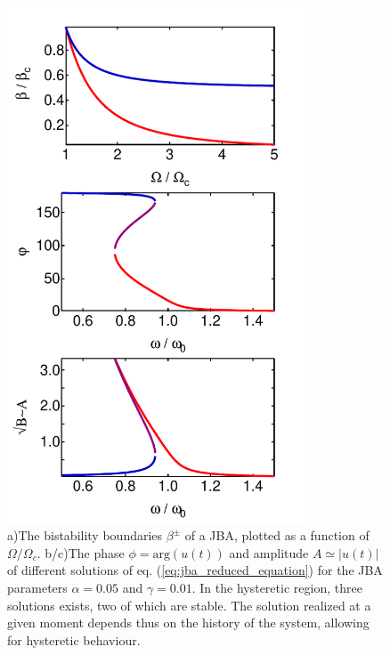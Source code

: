 \begin{figure}
	\includegraphics[width=9cm]{"./material/mathematica/jba_curves"}
	\caption{a)The bistability boundaries $\beta^\pm$ of a JBA, plotted as a function of $\Omega/\Omega_c$. b/c)The phase $\phi=\mathrm{arg}(u(t))$ and amplitude $A\simeq |u(t)|$ of different solutions of eq. (\ref{eq:jba_reduced_equation}) for the JBA parameters $\alpha=0.05$ and $\gamma=0.01$. In the hysteretic region, three solutions exists, two of which are stable. The solution realized at a given moment depends thus on the history of the system, allowing for hysteretic behaviour.}
	\label{fig:jba_curves}
\end{figure}
